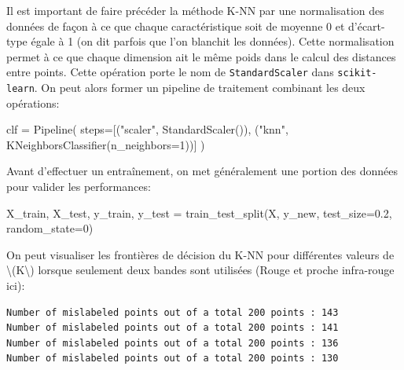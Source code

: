 \documentclass[
]{article}
\newenvironment{Shaded}{}{}
\newcommand{\DecValTok}[1]{\textcolor[rgb]{0.25,0.63,0.44}{#1}}
\newcommand{\FloatTok}[1]{\textcolor[rgb]{0.25,0.63,0.44}{#1}}
\newcommand{\NormalTok}[1]{#1}
\newcommand{\OperatorTok}[1]{\textcolor[rgb]{0.40,0.40,0.40}{#1}}
\newcommand{\StringTok}[1]{\textcolor[rgb]{0.25,0.44,0.63}{#1}}
\begin{document}
Il est important de faire précéder la méthode K-NN par une normalisation
des données de façon à ce que chaque caractéristique soit de moyenne 0
et d'écart-type égale à 1 (on dit parfois que l'on blanchit les
données). Cette normalisation permet à ce que chaque dimension ait le
même poids dans le calcul des distances entre points. Cette opération
porte le nom de \texttt{StandardScaler} dans \texttt{scikit-learn}. On
peut alors former un pipeline de traitement combinant les deux
opérations:

\label{cd7c7777}
\label{cb26}
\begin{Shaded}
\begin{Highlighting}[]
\NormalTok{clf }\OperatorTok{=}\NormalTok{ Pipeline(}
\NormalTok{    steps}\OperatorTok{=}\NormalTok{[(}\StringTok{"scaler"}\NormalTok{, StandardScaler()), (}\StringTok{"knn"}\NormalTok{, KNeighborsClassifier(n\_neighbors}\OperatorTok{=}\DecValTok{1}\NormalTok{))]}
\NormalTok{)}
\end{Highlighting}
\end{Shaded}

Avant d'effectuer un entraînement, on met généralement une portion des
données pour valider les performances:

\label{44d7d104}
\label{cb27}
\begin{Shaded}
\begin{Highlighting}[]
\NormalTok{X\_train, X\_test, y\_train, y\_test }\OperatorTok{=}\NormalTok{ train\_test\_split(X, y\_new, test\_size}\OperatorTok{=}\FloatTok{0.2}\NormalTok{, random\_state}\OperatorTok{=}\DecValTok{0}\NormalTok{)}
\end{Highlighting}
\end{Shaded}

On peut visualiser les frontières de décision du K-NN pour différentes
valeurs de {\textbackslash(K\textbackslash)} lorsque seulement deux
bandes sont utilisées (Rouge et proche infra-rouge ici):

\label{08a687eb}
\begin{verbatim}
Number of mislabeled points out of a total 200 points : 143
Number of mislabeled points out of a total 200 points : 141
Number of mislabeled points out of a total 200 points : 136
Number of mislabeled points out of a total 200 points : 130
\end{verbatim}
\end{document}
